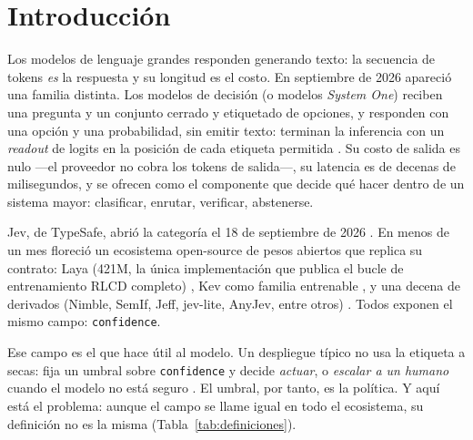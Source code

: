 \section{Introducción}
\label{sec:introduccion}

Los modelos de lenguaje grandes responden generando texto: la secuencia de tokens \emph{es} la respuesta y
su longitud es el costo. En septiembre de 2026 apareció una familia distinta. Los modelos de
decisión (o modelos \emph{System One}) reciben una pregunta y un conjunto cerrado y etiquetado de
opciones, y responden con una opción y una probabilidad, sin emitir texto: terminan la inferencia
con un \emph{readout} de logits en la posición de cada etiqueta permitida \cite{jev2026blog,jev2026docs}.
Su costo de salida es nulo ---el proveedor no cobra los tokens de salida---, su latencia es de decenas de milisegundos, y
se ofrecen como el componente que decide \guillemotleft qué hacer\guillemotright{} dentro de un sistema
mayor: clasificar, enrutar, verificar, abstenerse.

Jev, de TypeSafe, abrió la categoría el 18 de septiembre de 2026 \cite{jev2026blog}. En menos de un mes
floreció un ecosistema open-source de pesos abiertos que replica su contrato: Laya (421M,
la única implementación que publica el bucle de entrenamiento RLCD completo) \cite{layaRepo}, Kev
como familia entrenable \cite{kevRepo}, y una decena de derivados (Nimble, SemIf, Jeff, jev-lite, AnyJev,
entre otros) \cite{nimble,semif,jeff,jevLite,anyjev}. Todos exponen el mismo campo:
\texttt{confidence}.

Ese campo es el que hace útil al modelo. Un despliegue típico no usa la etiqueta a secas: fija un
umbral sobre \texttt{confidence} y decide \emph{actuar}, o \emph{escalar a un humano} cuando el
modelo no está seguro \cite{chow1970,geifman2017}. El umbral, por tanto, es la política. Y aquí
está el problema: aunque el campo se llame igual en todo el ecosistema, su definición no es la
misma (Tabla~\ref{tab:definiciones}).

\begin{table}[t]
\centering
\caption{Definiciones de \texttt{confidence} presentes en el ecosistema.}
\label{tab:definiciones}
\footnotesize
{}
\end{table}


